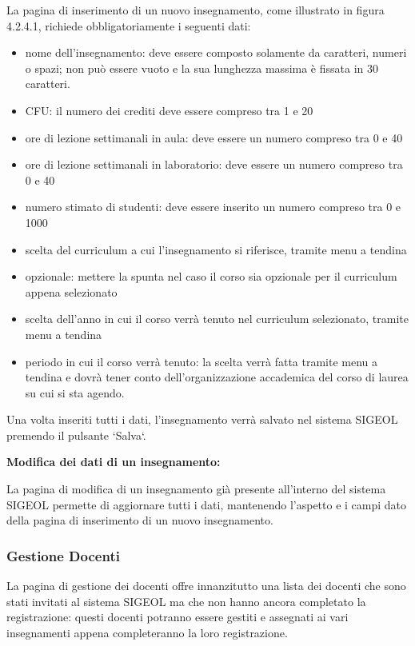 \documentclass[11pt,a4paper]{article}
\begin{document}
La pagina di inserimento di un nuovo insegnamento, come illustrato in figura 4.2.4.1, richiede obbligatoriamente i seguenti dati:
\begin{itemize}
 \item nome dell'insegnamento: deve essere composto solamente da caratteri, numeri o spazi; non può essere vuoto e la sua lunghezza massima è fissata in 30 caratteri.
 \item CFU: il numero dei crediti deve essere compreso tra 1 e 20
 \item ore di lezione settimanali in aula: deve essere un numero compreso tra 0 e 40
 \item ore di lezione settimanali in laboratorio: deve essere un numero compreso tra 0 e 40
 \item numero stimato di studenti: deve essere inserito un numero compreso tra 0 e 1000
 \item scelta del curriculum a cui l'insegnamento si riferisce, tramite menu a tendina
 \item opzionale: mettere la spunta nel caso il corso sia opzionale per il curriculum appena selezionato
 \item scelta dell'anno in cui il corso verrà tenuto nel curriculum selezionato, tramite menu a tendina
 \item periodo in cui il corso verrà tenuto: la scelta verrà fatta tramite menu a tendina e dovrà tener conto dell'organizzazione accademica del corso di laurea su cui si sta agendo.
\end{itemize}
Una volta inseriti tutti i dati, l'insegnamento verrà salvato nel sistema SIGEOL premendo il pulsante `Salva`.
\newline \newline
\begin{large}\textbf{Modifica dei dati di un insegnamento:}\end{large}
La pagina di modifica di un insegnamento già presente all'interno del sistema SIGEOL permette di aggiornare tutti i dati, mantenendo l'aspetto e i campi dato della pagina di inserimento di un nuovo insegnamento.
\subsubsection{Gestione Docenti}
La pagina di gestione dei docenti offre innanzitutto una lista dei docenti che sono stati invitati al sistema SIGEOL ma che non hanno ancora completato la registrazione: questi docenti potranno essere gestiti e assegnati ai vari insegnamenti appena completeranno la loro registrazione.
\end{document}
